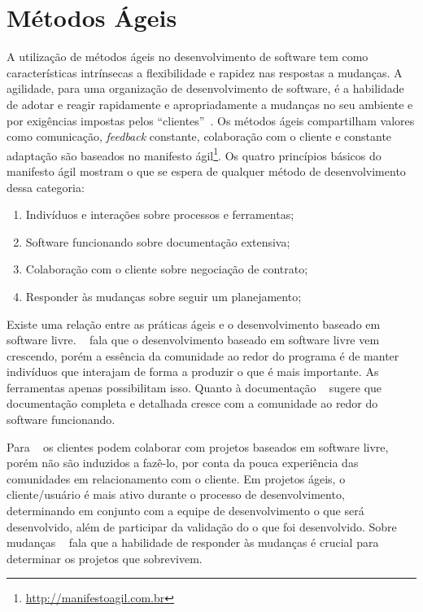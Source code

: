 \section{Métodos Ágeis}
\label{metodos-ageis}

A utilização de métodos ágeis no desenvolvimento de software tem como características 
intrínsecas a flexibilidade e rapidez nas respostas a mudanças. 
%
A agilidade, para uma organização de desenvolvimento de software, é a habilidade 
de adotar e reagir rapidamente e apropriadamente a mudanças no seu ambiente e por 
exigências impostas pelos ``clientes''~\cite{nerur2005}.
Os métodos ágeis compartilham valores como comunicação, \emph{feedback} constante, colaboração com o cliente e constante adaptação são baseados no manifesto ágil\footnote{\url{http://manifestoagil.com.br}}. Os quatro princípios básicos do manifesto ágil mostram o que se espera de qualquer método de desenvolvimento dessa categoria:
%
\begin{enumerate}
\item Indivíduos  e interações sobre processos e ferramentas;
\item Software funcionando sobre documentação extensiva;
\item Colaboração com o cliente sobre negociação de contrato;
\item Responder às  mudanças sobre seguir um planejamento;
\end{enumerate}

Existe uma relação entre as práticas ágeis e o desenvolvimento baseado em software livre. ~ fala que o desenvolvimento baseado em software livre vem crescendo, porém a essência da comunidade ao redor do programa é de manter indivíduos que interajam de forma a produzir o que é mais importante. As ferramentas apenas possibilitam isso. 
%
Quanto à documentação ~ sugere que documentação completa e detalhada cresce com a comunidade ao redor do software funcionando.

Para ~ os clientes podem colaborar com projetos baseados em software livre, porém não são induzidos a fazê-lo, por conta da pouca experiência das comunidades em relacionamento com o cliente. 
%
Em projetos ágeis, o cliente/usuário é mais ativo durante o processo de desenvolvimento, determinando em conjunto com a equipe de desenvolvimento o que será desenvolvido, além de participar da validação do o que foi desenvolvido.
%
Sobre mudanças ~ fala que a habilidade de responder às mudanças é crucial para determinar os projetos que sobrevivem.

